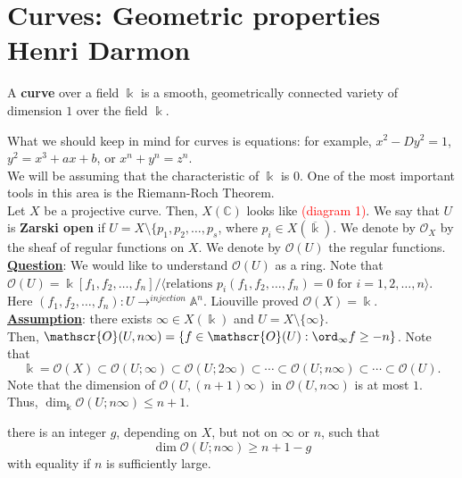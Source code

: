 \chapter{Curves:  Geometric properties \\ Henri Darmon}\label{ch:5}

\begin{definition}
A \textbf{curve} over a field $\Bbbk$ is a smooth, geometrically connected variety of dimension $1$ over the field $\Bbbk$.
\end{definition}
What we should keep in mind for curves is equations:  for example, $x^{2}-Dy^{2}=1$, $y^{2}=x^{3}+ax+b$, or $x^{n}+y^{n}=z^{n}$.\\
\indent We will be assuming that the characteristic of $\Bbbk$ is $0$.
\indent One of the most important tools in this area is the Riemann-Roch Theorem.\\
\indent Let $X$ be a projective curve.  Then, $X(\mathbb{C})$ looks like \textcolor{red}{(diagram 1)}.  We say that $U$ is \textbf{Zarski open} if $U=X \setminus \{p_{1},p_{2},\dotsc,p_{s}$, where $p_{i} \in X(\overline{\Bbbk})$.  We denote by $\mathscr{O}_{X}$ by the sheaf of regular functions on $X$.  We denote by $\mathscr{O}(U)$ the regular functions.\\
\indent \underline{\textbf{Question}}:  We would like to understand $\mathscr{O}(U)$ as a ring.  Note that $\mathscr{O}(U)=\Bbbk[f_{1},f_{2},\dotsc,f_{n}]/\langle\text{relations } p_{i}(f_{1},f_{2},\dotsc,f_{n})=0 \text{ for } i=1,2,\dotsc,n\rangle$.  Here $(f_{1},f_{2},\dotsc,f_{n}):U \to^{injection} \mathbb{A}^{n}$.  Liouville proved $\mathscr{O}(X)=\Bbbk$.\\
\indent \underline{\textbf{Assumption}}:  there exists $\infty \in X(\Bbbk)$ and $U=X \setminus \{\infty\}$.\\
\indent Then, $\mathscr{O}(U,n\infty)=\{f \in \mathscr{O}(U): \ord_{\infty} f \ge -n\}$.  Note that
\begin{equation*}
\Bbbk=\mathscr{O}(X) \subset \mathscr{O}(U;\infty) \subset \mathscr{O}(U;2\infty) \subset \dotsb \subset \mathscr{O}(U;n\infty) \subset \dotsb \subset \mathscr{O}(U).
\end{equation*}
Note that the dimension of $\mathscr{O}(U,(n+1)\infty)$ in $\mathscr{O}(U,n\infty)$ is at most $1$.  Thus, $\dim_{\Bbbk} \mathscr{O}(U;n\infty) \le n+1$.
\begin{theorem}
there is an integer $g$, depending on $X$, but not on $\infty$ or $n$, such that
\begin{equation*}
\dim \mathscr{O}(U;n\infty) \ge n+1-g
\end{equation*}
with equality if $n$ is sufficiently large.
\end{theorem}
